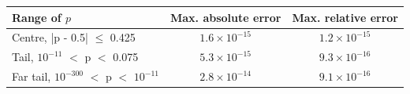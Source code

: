 \begin{tabular}{lcc}
\toprule
Range of $p$ & Max. absolute error & Max. relative error \\
\midrule
Centre, |p - 0.5| $\le$ 0.425 & $1.6\times 10^{-15}$ & $1.2\times 10^{-15}$ \\
Tail, $10^{-11}$ $<$ p $<$ 0.075 & $5.3\times 10^{-15}$ & $9.3\times 10^{-16}$ \\
Far tail, $10^{-300}$ $<$ p $<$ $10^{-11}$ & $2.8\times 10^{-14}$ & $9.1\times 10^{-16}$ \\
\bottomrule
\end{tabular}
